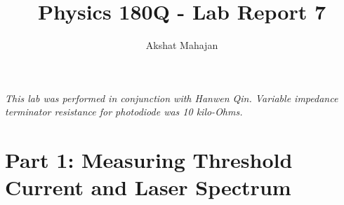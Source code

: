 \documentclass[10pt,a4paper]{article}
\author{Akshat Mahajan}
\title{Physics 180Q - Lab Report 7}
\begin{document}
\maketitle
\noindent \textsl{This lab was performed in conjunction with Hanwen Qin. Variable impedance terminator resistance for photodiode was 10 kilo-Ohms.}
\section*{Part 1: Measuring Threshold Current and Laser Spectrum}
\end{document}
